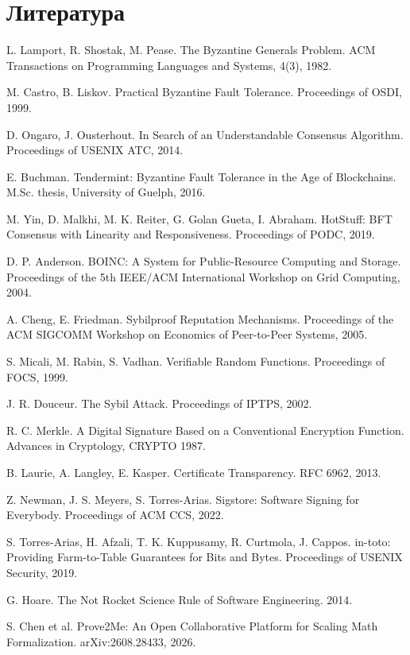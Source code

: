 \documentclass[11pt,a4paper]{article}
\begin{document}
\section*{Литература}
\begin{english}
\begin{enumerate}[label={[\arabic*]},leftmargin=2.6em,itemsep=2pt]
\item L. Lamport, R. Shostak, M. Pease. The Byzantine Generals Problem. ACM Transactions on Programming Languages and Systems, 4(3), 1982.
\item M. Castro, B. Liskov. Practical Byzantine Fault Tolerance. Proceedings of OSDI, 1999.
\item D. Ongaro, J. Ousterhout. In Search of an Understandable Consensus Algorithm. Proceedings of USENIX ATC, 2014.
\item E. Buchman. Tendermint: Byzantine Fault Tolerance in the Age of Blockchains. M.Sc. thesis, University of Guelph, 2016.
\item M. Yin, D. Malkhi, M. K. Reiter, G. Golan Gueta, I. Abraham. HotStuff: BFT Consensus with Linearity and Responsiveness. Proceedings of PODC, 2019.
\item D. P. Anderson. BOINC: A System for Public-Resource Computing and Storage. Proceedings of the 5th IEEE/ACM International Workshop on Grid Computing, 2004.
\item A. Cheng, E. Friedman. Sybilproof Reputation Mechanisms. Proceedings of the ACM SIGCOMM Workshop on Economics of Peer-to-Peer Systems, 2005.
\item S. Micali, M. Rabin, S. Vadhan. Verifiable Random Functions. Proceedings of FOCS, 1999.
\item J. R. Douceur. The Sybil Attack. Proceedings of IPTPS, 2002.
\item R. C. Merkle. A Digital Signature Based on a Conventional Encryption Function. Advances in Cryptology, CRYPTO 1987.
\item B. Laurie, A. Langley, E. Kasper. Certificate Transparency. RFC 6962, 2013.
\item Z. Newman, J. S. Meyers, S. Torres-Arias. Sigstore: Software Signing for Everybody. Proceedings of ACM CCS, 2022.
\item S. Torres-Arias, H. Afzali, T. K. Kuppusamy, R. Curtmola, J. Cappos. in-toto: Providing Farm-to-Table Guarantees for Bits and Bytes. Proceedings of USENIX Security, 2019.
\item G. Hoare. The Not Rocket Science Rule of Software Engineering. 2014.
\item S. Chen et al. Prove2Me: An Open Collaborative Platform for Scaling Math Formalization. arXiv:2608.28433, 2026.

\end{enumerate}
\end{english}
\end{document}
